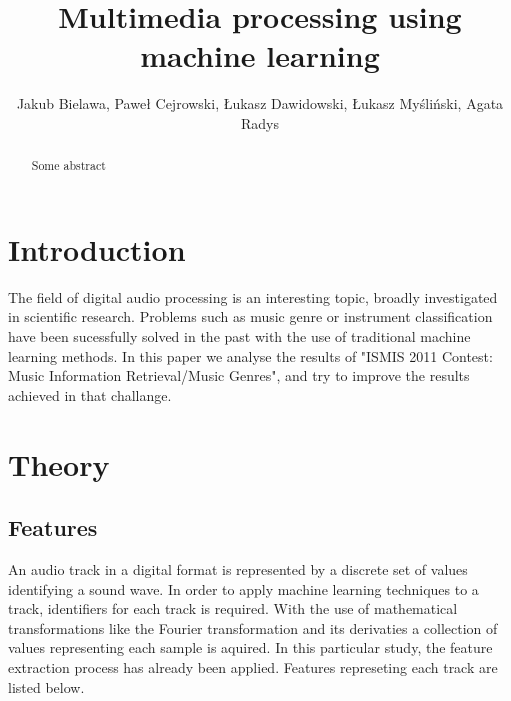 \documentclass[journal, a4paper]{IEEEtran}
\begin{document}
	\title{Multimedia processing using machine learning}
	\author{Jakub Bielawa, Paweł Cejrowski, Łukasz Dawidowski, Łukasz Myśliński, Agata Radys}
	\maketitle

\begin{abstract}
Some abstract
\end{abstract}

\section{Introduction}
The field of digital audio processing is an interesting topic, broadly investigated in scientific research. Problems such as music genre or instrument classification have been sucessfully solved in the past with the use of traditional machine learning methods. In this paper we analyse the results of "ISMIS 2011 Contest: Music Information Retrieval/Music Genres", and try to improve the results achieved in that challange. 
\section{Theory}
\subsection{Features}

An audio track in a digital format is represented by a discrete set of values identifying a sound wave. In order to apply machine learning techniques to a track, identifiers for each track is required. With the use of mathematical transformations like the Fourier transformation and its derivaties a collection of values representing each sample is aquired. In this particular study, the feature extraction process has already been applied. Features represeting each track are listed below.
\end{document}
